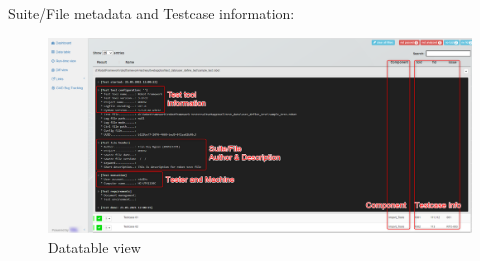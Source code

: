 Suite/File metadata and Testcase information:

\begin{figure}[h!]
  \includegraphics[width=1\linewidth]{./pictures/Datatable.png}
  \caption{Datatable view}
\end{figure}